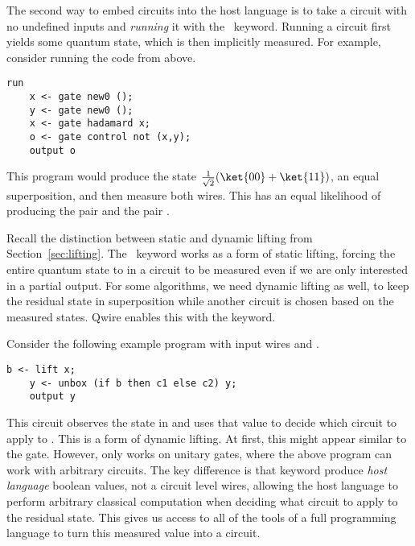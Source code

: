 The second way to embed circuits into the host language is to take a circuit with no undefined inputs and \emph{running} it with the \run~keyword.
Running a circuit first yields some quantum state, which is then implicitly measured.
For example, consider running the code from above.
\begin{lstlisting}[style=customcoq]
run
    x <- gate new0 ();
    y <- gate new0 ();
    x <- gate hadamard x;
    o <- gate control not (x,y);
    output o
\end{lstlisting}
This program would produce the state $\frac{1}{\sqrt{2}}(\ket{00} + \ket{11})$, an equal superposition, and then measure both wires.
This has an equal likelihood of producing the pair  and the pair .

Recall the distinction between static and dynamic lifting from Section~\ref{sec:lifting}.
The \run~keyword works as a form of static lifting, forcing the entire quantum state to in a circuit to be measured even if we are only interested in a partial output.
For some algorithms, we need dynamic lifting as well, to keep the residual state in superposition while another circuit is chosen based on the measured states.
Qwire enables this with the  keyword.

Consider the following example program with input wires  and .
\begin{lstlisting}[style=customcoq]
    b <- lift x;
    y <- unbox (if b then c1 else c2) y;
    output y
\end{lstlisting}
This circuit observes the state in  and uses that value to decide which circuit to apply to .
This is a form of dynamic lifting.
At first, this might appear similar to the  gate.
However,  only works on unitary gates, where the above program can work with arbitrary circuits.
The key difference is that  keyword produce \emph{host language} boolean values, not a circuit level wires, allowing the host language to perform arbitrary classical computation when deciding what circuit to apply to the residual state.
This gives us access to all of the tools of a full programming language to turn this measured value into a circuit.


